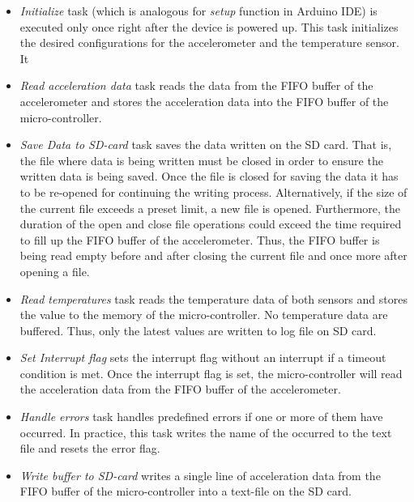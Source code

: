 \documentclass[english,12pt,a4paper,pdftex,elec,utf8]{aaltothesis}
\begin{document}
\begin{itemize}

\item \textit{Initialize} task (which is analogous for \textit{setup} function in Arduino IDE) is executed only once right after the device is powered up. This task initializes the desired configurations for the accelerometer and the temperature sensor. It

\item \textit{Read acceleration data} task reads the data from the FIFO buffer of the accelerometer and stores the acceleration data into the FIFO buffer of the micro-controller.

\item \textit{Save Data to SD-card} task saves the data written on the SD card. That is, the file where data is being written must be closed in order to ensure the written data is being saved. Once the file is closed for saving the data it has to be re-opened for continuing the writing process. Alternatively, if the size of the current file exceeds a preset limit, a new file is opened. Furthermore, the duration of the open and close file operations could exceed the time required to fill up the FIFO buffer of the accelerometer. Thus, the FIFO buffer is being read empty before and after closing the current file and once more after opening a file. 

\item \textit{Read temperatures} task reads the temperature data of both sensors and stores the value to the memory of the micro-controller. No temperature data are buffered. Thus, only the latest values are written to log file on SD card.
\item \textit{Set Interrupt flag} sets the interrupt flag without an interrupt if a timeout condition is met. Once the interrupt flag is set, the micro-controller will read the acceleration data from the FIFO buffer of the accelerometer.

\item \textit{Handle errors} task handles predefined errors if one or more of them have occurred. In practice, this task writes the name of the occurred to the text file and resets the error flag.

\item \textit{Write buffer to SD-card} writes a single line of acceleration data from the FIFO buffer of the micro-controller into a text-file on the SD card.
\end{itemize}
\end{document}
